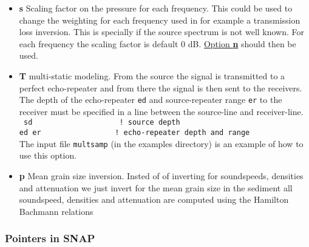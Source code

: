 \documentclass{saclantc}
\begin{document}
\begin{itemize}
\item{\bf s} Scaling factor on the pressure for each frequency. This could be used to change the weighting for each frequency used in for example a transmission loss inversion. This is specially if the source spectrum is not well known. 
For each frequency the scaling factor is default 0 dB. 
 \underline{Option \bf n} should then be used.
\item{\bf T} multi-static modeling. From the source the signal is transmitted to a perfect echo-repeater and from there the signal is then sent to the receivers.
The depth of the echo-repeater {\tt ed} and source-repeater range {\tt er} to the receiver must be specified in a line between the source-line and receiver-line.\\
{\tt
sd      ~~~~~~~~~~~~~~~~~~      ! source depth\\
ed er       ~~~~~~~~~~~~~~~       ! echo-repeater depth and range\\
}
 The input file {\tt multsamp} (in the examples directory) is an example of how to use this option.

\item{\bf p} Mean grain size inversion. Insted of of inverting for
soundspeeds, densities and attenuation we just invert for the mean
grain size in the sediment all soundspeed, densities and attenuation
are computed using the Hamilton Bachmann relations\cite{hamilton80}
\end{itemize}

\subsubsection{Pointers in SNAP}
\label{se:snappoint}
\end{document}
